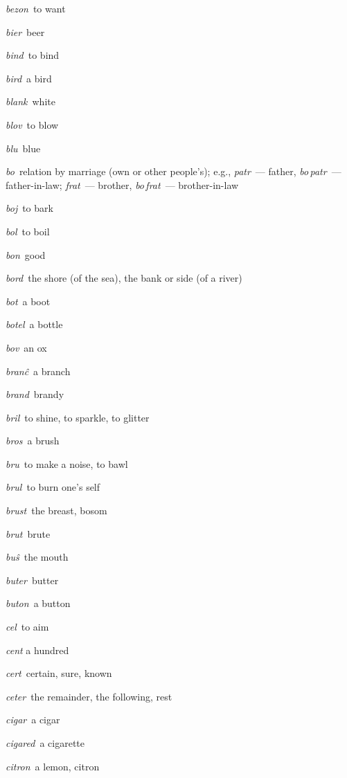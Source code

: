 \begin{landscape}
\begin{multicols}{5}
\begin{outdent}{1em}
\emph{bezon\,} to want

\emph{bier\,} beer

\emph{bind\,} to bind

\emph{bird\,} a bird

\emph{blank\,} white

\emph{blov\,} to blow

\emph{blu\,} blue

\emph{bo\,} relation by marriage (own or other people’s); e.g., \emph{patr\,} — father, \emph{bo\,patr\,} — father-in-law; \emph{frat\,} — brother, \emph{bo\,frat\,} — brother-in-law

\emph{boj\,} to bark

\emph{bol\,} to boil

\emph{bon\,} good

\emph{bord\,} the shore (of the sea), the bank or side (of a river)

\emph{bot\,} a boot

\emph{botel\,} a bottle

\emph{bov\,} an ox

\emph{branĉ\,} a branch

\emph{brand\,} brandy

\emph{bril\,} to shine, to sparkle, to glitter

\emph{bros\,} a brush

\emph{bru\,} to make a noise, to bawl

\emph{brul\,} to burn one’s self

\emph{brust\,} the breast, bosom

\emph{brut\,} brute

\emph{buŝ\,} the mouth

\emph{buter\,} butter

\emph{buton\,} a button
\end{outdent}


\begin{outdent}{1em}
\emph{cel\,} to aim

\emph{cent} a hundred

\emph{cert\,} certain, sure, known

\emph{ceter\,} the remainder, the following, rest

\emph{cigar\,} a cigar

\emph{cigared\,} a cigarette

\emph{citron\,} a lemon, citron
\end{outdent}


\end{multicols}
\end{landscape}
